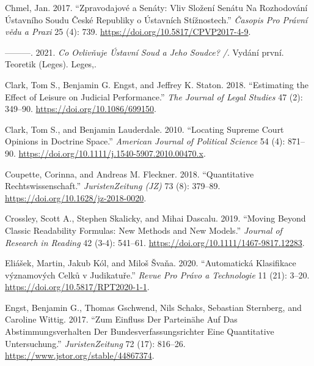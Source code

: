\documentclass[
  11pt,
]{article}
\newlength{\cslhangindent}
\newenvironment{CSLReferences}[2] %
 {%
  \setlength{\parindent}{0pt}
  \ifodd #1 \everypar{\setlength{\hangindent}{\cslhangindent}}\ignorespaces\fi
  \ifnum #2 > 0
  \setlength{\parskip}{#2\baselineskip}
  \fi
 }%
 {}
\begin{document}
\begin{CSLReferences}{1}{0}
\leavevmode{}%
Chmel, Jan. 2017. {``Zpravodajov{é} a Sen{á}ty: {Vliv} Slo{ž}en{í}
Sen{á}tu Na Rozhodov{á}n{í} {{Ú}stavn{í}ho} Soudu {{Č}esk{é}} Republiky
o {Ú}stavn{í}ch St{í}{ž}nostech.''} \emph{{Č}asopis Pro Pr{á}vn{í}
v{ě}du a Praxi} 25 (4): 739. \url{https://doi.org/10.5817/CPVP2017-4-9}.

\leavevmode{}%
---------. 2021. \emph{Co Ovliv{ň}uje {{Ú}stavn{í}} Soud a Jeho Soudce?
/}. Vyd{á}n{í} prvn{í}. Teoretik ({Leges}). {Leges,}.

\leavevmode{}%
Clark, Tom S., Benjamin G. Engst, and Jeffrey K. Staton. 2018.
{``Estimating the {Effect} of {Leisure} on {Judicial Performance}.''}
\emph{The Journal of Legal Studies} 47 (2): 349--90.
\url{https://doi.org/10.1086/699150}.

\leavevmode{}%
Clark, Tom S., and Benjamin Lauderdale. 2010. {``Locating {Supreme Court
Opinions} in {Doctrine Space}.''} \emph{American Journal of Political
Science} 54 (4): 871--90.
\url{https://doi.org/10.1111/j.1540-5907.2010.00470.x}.

\leavevmode{}%
Coupette, Corinna, and Andreas M. Fleckner. 2018. {``Quantitative
{Rechtswissenschaft}.''} \emph{JuristenZeitung (JZ)} 73 (8): 379--89.
\url{https://doi.org/10.1628/jz-2018-0020}.

\leavevmode{}%
Crossley, Scott A., Stephen Skalicky, and Mihai Dascalu. 2019. {``Moving
Beyond Classic Readability Formulas: New Methods and New Models.''}
\emph{Journal of Research in Reading} 42 (3-4): 541--61.
\url{https://doi.org/10.1111/1467-9817.12283}.

\leavevmode{}%
Eliášek, Martin, Jakub Kól, and Miloš Švaňa. 2020. {``Automatick{á}
Klasifikace v{ý}znamov{ý}ch Celk{ů} v Judikatu{ř}e.''} \emph{Revue Pro
Pr{á}vo a Technologie} 11 (21): 3--20.
\url{https://doi.org/10.5817/RPT2020-1-1}.

\leavevmode{}%
Engst, Benjamin G., Thomas Gschwend, Nils Schaks, Sebastian Sternberg,
and Caroline Wittig. 2017. {``Zum {Einfluss} Der {Partein{ä}he} Auf Das
{Abstimmungsverhalten} Der {Bundesverfassungsrichter} {\textendash} Eine
Quantitative {Untersuchung}.''} \emph{JuristenZeitung} 72 (17): 816--26.
\url{https://www.jstor.org/stable/44867374}.


\end{CSLReferences}
\end{document}
